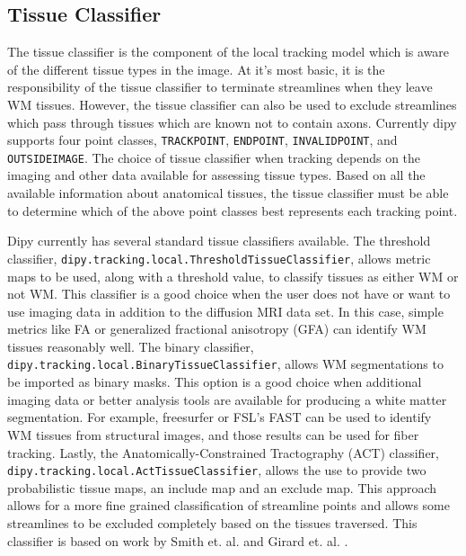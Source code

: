 \subsection{Tissue Classifier}
    The tissue classifier is the component of the local tracking model which is aware of the different tissue types in the image. At it's most basic, it is the responsibility of the tissue classifier to terminate streamlines when they leave WM tissues. However, the tissue classifier can also be used to exclude streamlines which pass through tissues which are known not to contain axons. Currently dipy supports four point classes, \verb|TRACKPOINT|, \verb|ENDPOINT|, \verb|INVALIDPOINT|, and \verb|OUTSIDEIMAGE|. The choice of tissue classifier when tracking depends on the imaging and other data available for assessing tissue types. Based on all the available information about anatomical tissues, the tissue classifier must be able to determine which of the above point classes best represents each tracking point.
    
    Dipy currently has several standard tissue classifiers available. The threshold classifier, \verb|dipy.tracking.local.ThresholdTissueClassifier|, allows metric maps to be used, along with a threshold value, to classify tissues as either WM or not WM. This classifier is a good choice when the user does not have or want to use imaging data in addition to the diffusion MRI data set. In this case, simple metrics like FA or generalized fractional anisotropy (GFA) can identify WM tissues reasonably well. The binary classifier, \verb|dipy.tracking.local.BinaryTissueClassifier|, allows WM segmentations to be imported as binary masks. This option is a good choice when additional imaging data or better analysis tools are available for producing a white matter segmentation. For example, freesurfer \cite{Dale_1999} or FSL's FAST \cite{Zhang_2001} can be used to identify WM tissues from structural images, and those results can be used for fiber tracking. Lastly, the Anatomically-Constrained Tractography (ACT) classifier, \verb|dipy.tracking.local.ActTissueClassifier|, allows the use to provide two probabilistic tissue maps, an include map and an exclude map. This approach allows for a more fine grained classification of streamline points and allows some streamlines to be excluded completely based on the tissues traversed. This classifier is based on work by Smith et. al. \cite{Smith_2012} and Girard et. al. \cite{girard2014towards}.
    
